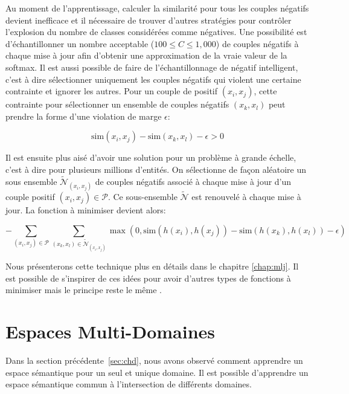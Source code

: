 Au moment de l'apprentissage, calculer la similarité pour tous les couples
négatifs devient inefficace et il nécessaire de trouver d'autres stratégies
pour contrôler l'explosion du nombre de classes considérées comme négatives.
Une possibilité est d'échantillonner un nombre acceptable ($100\leq C\leq 1,000$) de couples négatifs à chaque
mise à jour afin d'obtenir une approximation de la vraie valeur de la softmax.
Il est aussi possible de faire de l'échantillonnage de négatif intelligent, c'est à dire
sélectionner uniquement les couples négatifs qui violent une certaine
contrainte et ignorer les autres. Pour un couple de positif $(x_i, x_j)$, cette
contrainte pour sélectionner un ensemble de couples négatifs $(x_k, x_l)$ peut
prendre la forme d'une violation de marge $\epsilon$:

\begin{equation}
\textrm{sim}(x_i, x_j) - \textrm{sim}(x_k, x_l) - \epsilon > 0
\end{equation}

Il est ensuite plus aisé d'avoir une solution pour un problème à grande
échelle, c'est à dire pour plusieurs millions d'entités. On sélectionne de
façon aléatoire un sous ensemble $\tilde{\mathcal{N}}_{(x_i, x_j)}$ de couples
négatifs associé à chaque mise à jour d'un couple positif $(x_i,
x_j)\in\mathcal{P}$.  Ce sous-ensemble $\tilde{\mathcal{N}}$ est renouvelé à
chaque mise à jour. La fonction à minimiser devient alors:  

\begin{equation}
-\sum_{(x_i, x_j)\in\mathcal{P}}\sum_{(x_k, x_l)\in\tilde{\mathcal{N}}_{(x_i, x_j)}} \max (0, \textrm{sim}(h(x_i), h(x_j)) - \textrm{sim}(h(x_k), h(x_l)) - \epsilon)
\label{eq:min-sim}
\end{equation}

Nous présenterons cette technique \citep{image-wsabie} plus en détails dans le chapitre
\ref{chap:mlj}. Il est possible de s'inspirer de ces idées pour avoir d'autres
types de fonctions à minimiser mais le principe reste le même \citep{rnn58}.

\section{Espaces Multi-Domaines}

Dans la section précédente~\ref{sec:chd}, nous avons observé comment apprendre un espace
sémantique pour un seul et unique domaine. Il est possible d'apprendre un espace
sémantique commun à l'intersection de différents domaines.  

